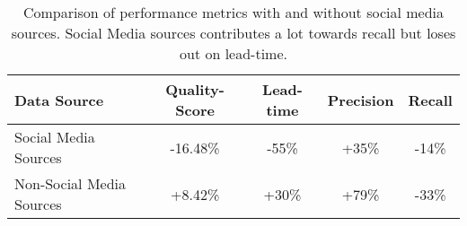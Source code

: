 
\begin{table}
\small
\caption{Comparison of performance metrics with and without social media sources. Social Media sources contributes a lot towards recall but loses out on
lead-time.}
\label{tb:ablation_twitter}
\begin{tabular}{|L|c|c|c|c|}
\hline
Data Source          & Quality-Score & Lead-time & Precision & Recall \\
\hline
Social Media Sources & -16.48\% &-55\% &+35\% &-14\% \\
\hline
Non-Social Media Sources & +8.42\% & +30\%  &+79\% &-33\% \\
\hline
\end{tabular}
\end{table}
